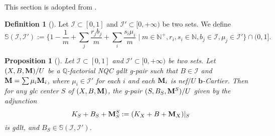 \documentclass[11pt]{amsart}
\numberwithin{equation}{section}
\newcommand{\bb}{\bm{b}}
\newcommand{\Mm}{{\bf{M}}}
\newcommand{\Qq}{\mathbb{Q}}
\newcommand{\Ii}{\mathcal{I}}
\newtheorem{prop}[thm]{Proposition}
\theoremstyle{definition}
\newtheorem{defn}[thm]{Definition}
\theoremstyle{definition}
\theoremstyle{definition}
\begin{document}
This section is adopted from \cite[Version 2, Section 6]{HL21}. 

\begin{defn}[{\cite[Definition 6.1]{HL21}}]\label{defn: gpair set for difficulty}
Let $\Ii\subset [0,1]$ and $\Ii'\subset [0,+\infty)$ be two sets. We define
$$\mathbb S(\Ii,\Ii'):=\{1-\frac{1}{m}+\sum_j\frac{r_jb_j}{m}+\sum_i\frac{s_i\mu_i}{m}\mid m\in\mathbb N^+,r_i,s_i\in\mathbb N, b_j\in\Ii,\mu_j\in\Ii'\}\cap ( 0,1].$$
\end{defn}

\begin{prop}[{\cite[Proposition 2.8]{HL18}}]\label{prop: hl18 2.8}
Let $\Ii\subset [0,1]$ and $\Ii'\subset [0,+\infty)$ be two sets. Let $(X,B,\Mm)/U$ be a $\Qq$-factorial NQC gdlt g-pair such that $B\in\Ii$ and $\Mm=\sum\mu_i\Mm_i$, where $\mu_i\in\Ii'$ for each $i$ and each $\Mm_i$ is nef$/U$ $\bb$-Cartier. Then for any glc center $S$ of $(X,B,\Mm)$, the g-pair $(S,B_S,\Mm^S)/U$ given by the adjunction
$$K_S+B_S+\Mm^S_S:=(K_X+B+\Mm_X)|_S$$
is gdlt, and $B_S\in\mathbb S(\Ii,\Ii')$.
\end{prop}
\end{document}
